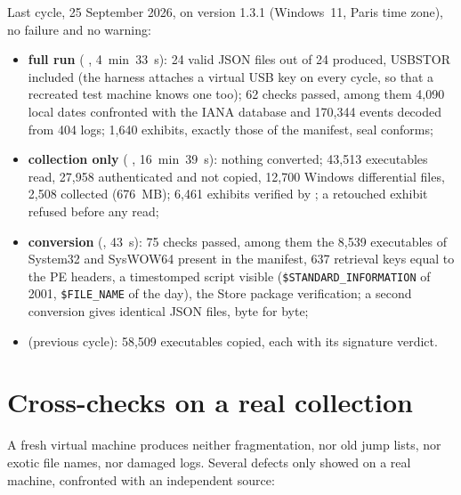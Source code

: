 \documentclass[11pt,a4paper,oneside]{report}
\begin{document}
Last cycle, 25 September 2026, on version 1.3.1 (Windows~11, Paris time zone),
no failure and no warning:

\begin{itemize}
  \item \textbf{full run} ( , 4~min~33~s): 24 valid JSON
    files out of 24 produced, USBSTOR included (the harness attaches a virtual
    USB key on every cycle, so that a recreated test machine knows one too);
    62 checks passed, among them 4,090 local dates confronted with the IANA
    database and 170,344 events decoded from 404 logs; 1,640 exhibits, exactly
    those of the manifest, seal conforms;
  \item \textbf{collection only} (  ,
    16~min~39~s): nothing converted; 43,513 executables read, 27,958 authenticated
    and not copied, 12,700 Windows differential files, 2,508 collected
    (676~MB); 6,461 exhibits verified by ; a
    retouched exhibit refused before any read;
  \item \textbf{conversion} (, 43~s): 75 checks passed, among
    them the 8,539 executables of System32 and SysWOW64 present in the
    manifest, 637 retrieval keys equal to the PE headers, a timestomped script
    visible (\texttt{\$STANDARD\_\allowbreak INFORMATION} of 2001, \texttt{\$FILE\_NAME} of the day), the Store
    package verification; a second conversion gives identical JSON files, byte
    for byte;
  \item \textbf{} (previous cycle): 58,509 executables copied,
    each with its signature verdict.
\end{itemize}

\chapter{Cross-checks on a real collection}\label{ch:reel}

A fresh virtual machine produces neither fragmentation, nor old jump lists,
nor exotic file names, nor damaged logs. Several defects only showed on a real
machine, confronted with an independent source:
\end{document}
